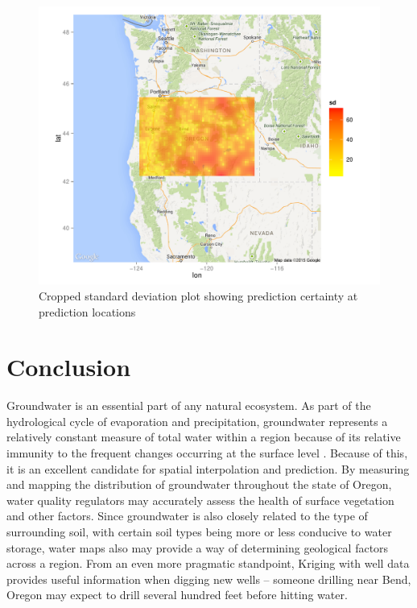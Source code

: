 \documentclass[12pt,twoside]{reedthesis}
\begin{document}
\begin{figure}[h]
	   
	       \centering
	  
	    \includegraphics[scale=0.9]{sd_crop}
	
	     \caption{Cropped standard deviation plot showing prediction certainty at prediction locations}
	 \label{sdcrop}
	\end{figure}
	

\chapter*{Conclusion}
	\setcounter{chapter}{4}
	\setcounter{section}{0}
	
Groundwater is an essential part of any natural ecosystem. As part of the hydrological cycle of evaporation and precipitation, groundwater represents a relatively constant measure of total water within a region because of its relative immunity to the frequent changes occurring at the surface level \cite{groundwater}. Because of this, it is an excellent candidate for spatial interpolation and prediction. By measuring and mapping the distribution of groundwater throughout the state of Oregon, water quality regulators may accurately assess the health of surface vegetation and other factors. Since groundwater is also closely related to the type of surrounding soil, with certain soil types being more or less conducive to water storage, water maps also may provide a way of determining geological factors across a region. From an even more pragmatic standpoint, Kriging with well data provides useful information when digging new wells -- someone drilling near Bend, Oregon may expect to drill several hundred feet before hitting water. 
\end{document}
